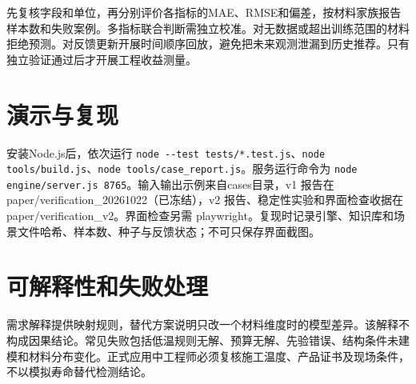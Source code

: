 \documentclass[UTF8,fontset=none,zihao=-4,a4paper]{ctexart}
\begin{document}
先复核字段和单位，再分别评价各指标的MAE、RMSE和偏差，按材料家族报告样本数和失败案例。多指标联合判断需独立校准。对无数据或超出训练范围的材料拒绝预测。对反馈更新开展时间顺序回放，避免把未来观测泄漏到历史推荐。只有独立验证通过后才开展工程收益测量。

\section*{演示与复现}
安装Node.js后，依次运行 \texttt{node -\allowbreak{}-\allowbreak{}test tests/\allowbreak{}*.\allowbreak{}test.\allowbreak{}js}、\texttt{node tools/\allowbreak{}build.\allowbreak{}js}、\texttt{node tools/\allowbreak{}case\_\allowbreak{}report.\allowbreak{}js}。服务运行命令为 \texttt{node engine/\allowbreak{}server.\allowbreak{}js 8765}。输入输出示例来自cases目录，v1 报告在paper/verification\_20261022（已冻结），v2 报告、稳定性实验和界面检查收据在paper/verification\_v2。界面检查另需 playwright。复现时记录引擎、知识库和场景文件哈希、样本数、种子与反馈状态；不可只保存界面截图。

\section*{可解释性和失败处理}
需求解释提供映射规则，替代方案说明只改一个材料维度时的模型差异。该解释不构成因果结论。常见失败包括低温规则无解、预算无解、先验错误、结构条件未建模和材料分布变化。正式应用中工程师必须复核施工温度、产品证书及现场条件，不以模拟寿命替代检测结论。
\end{document}
